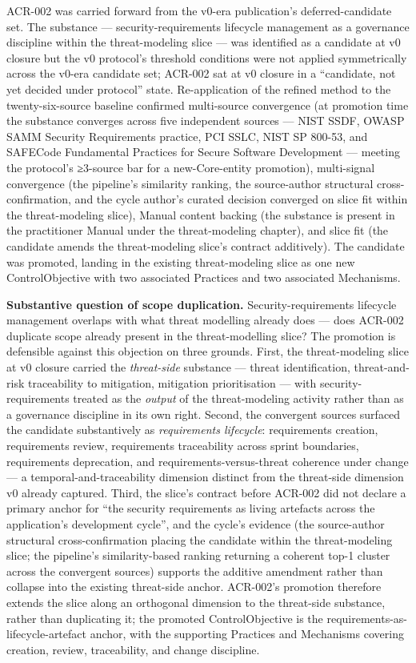 \documentclass[
]{article}
\begin{document}
ACR-002 was carried forward from the v0-era publication's
deferred-candidate set. The substance --- security-requirements
lifecycle management as a governance discipline within the
threat-modeling slice --- was identified as a candidate at v0 closure
but the v0 protocol's threshold conditions were not applied
symmetrically across the v0-era candidate set; ACR-002 sat at v0 closure
in a ``candidate, not yet decided under protocol'' state. Re-application
of the refined method to the twenty-six-source baseline confirmed
multi-source convergence (at promotion time the substance converges
across five independent sources --- NIST SSDF, OWASP SAMM Security
Requirements practice, PCI SSLC, NIST SP 800-53, and SAFECode
Fundamental Practices for Secure Software Development --- meeting the
protocol's ≥3-source bar for a new-Core-entity promotion), multi-signal
convergence (the pipeline's similarity ranking, the source-author
structural cross-confirmation, and the cycle author's curated decision
converged on slice fit within the threat-modeling slice), Manual content
backing (the substance is present in the practitioner Manual under the
threat-modeling chapter), and slice fit (the candidate amends the
threat-modeling slice's contract additively). The candidate was
promoted, landing in the existing threat-modeling slice as one new
ControlObjective with two associated Practices and two associated
Mechanisms.

\textbf{Substantive question of scope duplication.}
Security-requirements lifecycle management overlaps with what threat
modelling already does --- does ACR-002 duplicate scope already present
in the threat-modelling slice? The promotion is defensible against this
objection on three grounds. First, the threat-modeling slice at v0
closure carried the \emph{threat-side} substance --- threat
identification, threat-and-risk traceability to mitigation, mitigation
prioritisation --- with security-requirements treated as the
\emph{output} of the threat-modeling activity rather than as a
governance discipline in its own right. Second, the convergent sources
surfaced the candidate substantively as \emph{requirements lifecycle}:
requirements creation, requirements review, requirements traceability
across sprint boundaries, requirements deprecation, and
requirements-versus-threat coherence under change --- a
temporal-and-traceability dimension distinct from the threat-side
dimension v0 already captured. Third, the slice's contract before
ACR-002 did not declare a primary anchor for ``the security requirements
as living artefacts across the application's development cycle'', and
the cycle's evidence (the source-author structural cross-confirmation
placing the candidate within the threat-modeling slice; the pipeline's
similarity-based ranking returning a coherent top-1 cluster across the
convergent sources) supports the additive amendment rather than collapse
into the existing threat-side anchor. ACR-002's promotion therefore
extends the slice along an orthogonal dimension to the threat-side
substance, rather than duplicating it; the promoted ControlObjective is
the requirements-as-lifecycle-artefact anchor, with the supporting
Practices and Mechanisms covering creation, review, traceability, and
change discipline.
\end{document}

